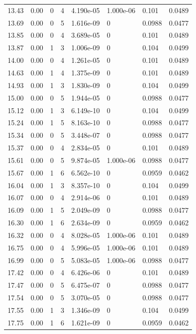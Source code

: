 \documentclass[preview]{standalone}
\begin{document}
{{{\begin{tabular}{L{1.2cm}C{1.2cm} C{0.3cm}C{0.5cm} C{1.4cm}C{1.4cm} C{1.4cm}C{1.4cm}}
  13.43  &  0.00  & 0     &  4 &  4.190e-05  & 1.000e-06  & 0.101 &  0.0489   \\ 
  13.69  &  0.00  & 0     &  5 &  1.616e-09  & 0  & 0.0988 &  0.0477   \\ 
  13.85  &  0.00  & 0     &  4 &  3.689e-05  & 0  & 0.101 &  0.0489   \\ 
  13.87  &  0.00  & 1     &  3 &  1.006e-09  & 0  & 0.104 &  0.0499   \\ 
  14.00  &  0.00  & 0     &  4 &  1.261e-05  & 0  & 0.101 &  0.0489   \\ 
  14.63  &  0.00  & 1     &  4 &  1.375e-09  & 0  & 0.101 &  0.0489   \\ 
  14.93  &  0.00  & 1     &  3 &  1.830e-09  & 0  & 0.104 &  0.0499   \\ 
  15.00  &  0.00  & 0     &  5 &  1.944e-05  & 0  & 0.0988 &  0.0477   \\ 
  15.12  &  0.00  & 1     &  3 &  6.149e-10  & 0  & 0.104 &  0.0499   \\ 
  15.24  &  0.00  & 1     &  5 &  8.163e-10  & 0  & 0.0988 &  0.0477   \\ 
  15.34  &  0.00  & 0     &  5 &  3.448e-07  & 0  & 0.0988 &  0.0477   \\ 
  15.37  &  0.00  & 0     &  4 &  2.834e-05  & 0  & 0.101 &  0.0489   \\ 
  15.61  &  0.00  & 0     &  5 &  9.874e-05  & 1.000e-06  & 0.0988 &  0.0477   \\ 
  15.67  &  0.00  & 1     &  6 &  6.562e-10  & 0  & 0.0959 &  0.0462   \\ 
  16.04  &  0.00  & 1     &  3 &  8.357e-10  & 0  & 0.104 &  0.0499   \\ 
  16.07  &  0.00  & 0     &  4 &  2.914e-06  & 0  & 0.101 &  0.0489   \\ 
  16.09  &  0.00  & 1     &  5 &  2.049e-09  & 0  & 0.0988 &  0.0477   \\ 
  16.30  &  0.00  & 1     &  6 &  2.634e-09  & 0  & 0.0959 &  0.0462   \\ 
  16.32  &  0.00  & 0     &  4 &  8.028e-05  & 1.000e-06  & 0.101 &  0.0489   \\ 
  16.75  &  0.00  & 0     &  4 &  5.996e-05  & 1.000e-06  & 0.101 &  0.0489   \\ 
  16.99  &  0.00  & 0     &  5 &  5.083e-05  & 1.000e-06  & 0.0988 &  0.0477   \\ 
  17.42  &  0.00  & 0     &  4 &  6.426e-06  & 0  & 0.101 &  0.0489   \\ 
  17.47  &  0.00  & 0     &  5 &  6.475e-07  & 0  & 0.0988 &  0.0477   \\ 
  17.54  &  0.00  & 0     &  5 &  3.070e-05  & 0  & 0.0988 &  0.0477   \\ 
  17.55  &  0.00  & 1     &  3 &  1.346e-09  & 0  & 0.104 &  0.0499   \\ 
  17.75  &  0.00  & 1     &  6 &  1.621e-09  & 0  & 0.0959 &  0.0462   \\ 
\hline 
\end{tabular} 

}}}
\end{document}

